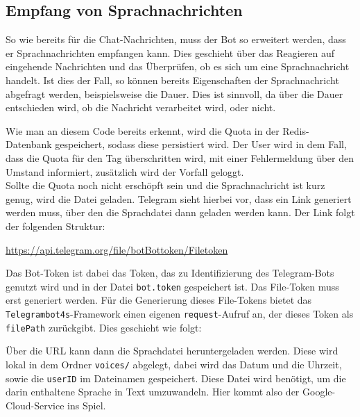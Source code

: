 \subsection{Empfang von Sprachnachrichten}
So wie bereits für die Chat-Nachrichten, muss der Bot so erweitert werden, dass er Sprachnachrichten empfangen kann. Dies geschieht über das Reagieren auf eingehende Nachrichten und das Überprüfen, ob es sich um eine Sprachnachricht handelt. Ist dies der Fall, so können bereits Eigenschaften der Sprachnachricht abgefragt werden, beispielsweise die Dauer. Dies ist sinnvoll, da über die Dauer entschieden wird, ob die Nachricht verarbeitet wird, oder nicht.


Wie man an diesem Code bereits erkennt, wird die Quota in der Redis-Datenbank gespeichert, sodass diese persistiert wird. Der User wird in dem Fall, dass die Quota für den Tag überschritten wird, mit einer Fehlermeldung über den Umstand informiert, zusätzlich wird der Vorfall geloggt. \\
Sollte die Quota noch nicht erschöpft sein und die Sprachnachricht ist kurz genug, wird die Datei geladen. Telegram sieht hierbei vor, dass ein Link generiert werden muss, über den die Sprachdatei dann geladen werden kann. Der Link folgt der folgenden Struktur:

\url{https://api.telegram.org/file/botBottoken/Filetoken}

Das Bot-Token ist dabei das Token, das zu Identifizierung des Telegram-Bots genutzt wird und in der Datei \texttt{bot.token} gespeichert ist. Das File-Token muss erst generiert werden. Für die Generierung dieses File-Tokens bietet das \texttt{Telegrambot4s}-Framework einen eigenen \texttt{request}-Aufruf an, der dieses Token als \texttt{filePath} zurückgibt. Dies geschieht wie folgt:


Über die URL kann dann die Sprachdatei heruntergeladen werden. Diese wird lokal in dem Ordner \texttt{voices/} abgelegt, dabei wird das Datum und die Uhrzeit, sowie die \texttt{userID} im Dateinamen gespeichert.
Diese Datei wird benötigt, um die darin enthaltene Sprache in Text umzuwandeln. Hier kommt also der Google-Cloud-Service ins Spiel.

